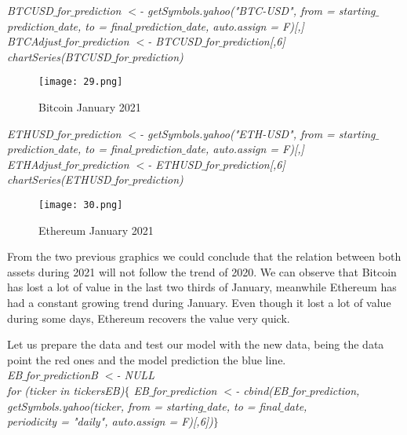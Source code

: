 \documentclass[14pt]{amsart}
\begin{document}
\noindent\textit{BTCUSD$\_$for$\_$prediction $<$- getSymbols.yahoo("BTC-USD", from = starting$\_$prediction$\_$date, to = final$\_$prediction$\_$date, auto.assign = F)[,]}\\
\noindent\textit{BTCAdjust$\_$for$\_$prediction $<$- BTCUSD$\_$for$\_$prediction[,6]}\\
\noindent\textit{chartSeries(BTCUSD$\_$for$\_$prediction)}\\

\begin{figure}[h!]
  \texttt{[image: 29.png]}
  \caption{Bitcoin January 2021}
  \label{fig:boat1}
\end{figure}

\noindent\textit{ETHUSD$\_$for$\_$prediction $<$- getSymbols.yahoo("ETH-USD", from = starting$\_$prediction$\_$date, to = final$\_$prediction$\_$date, auto.assign = F)[,]}\\
\noindent\textit{ETHAdjust$\_$for$\_$prediction $<$- ETHUSD$\_$for$\_$prediction[,6]}\\
\noindent\textit{chartSeries(ETHUSD$\_$for$\_$prediction)}\\

\begin{figure}[h!]
  \texttt{[image: 30.png]}
  \caption{Ethereum January 2021}
  \label{fig:boat1}
\end{figure}

From the two previous graphics we could conclude that the relation between both assets during 2021 will not follow the trend of 2020. We can observe that Bitcoin has lost a lot of value in the last two thirds of January, meanwhile Ethereum has had a constant growing trend during January. Even though it lost a lot of value during some days, Ethereum recovers the value very quick.

Let us prepare the data and test our model with the new data, being the data point the red ones and the model prediction the blue line.\\

\noindent \textit{EB$\_$for$\_$predictionB $<$- NULL}\\
\noindent \textit{for (ticker in tickersEB)$\{$  EB$\_$for$\_$prediction $<$- cbind(EB$\_$for$\_$prediction, }\\
\indent\textit{getSymbols.yahoo(ticker, from = starting$\_$date, to = final$\_$date, }\\
\indent\textit{periodicity = "daily", auto.assign = F)[,6])$\}$}\\ \\
\end{document}
